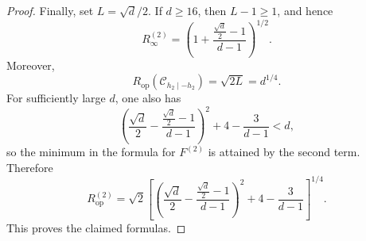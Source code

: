 \documentclass[10pt,a4paper]{amsart}
\begin{document}
\begin{proof}
Finally, set $L=\sqrt d/2$. If $d\ge16$, then $L-1\ge1$, and hence
\[
R_\infty^{(2)}
=
\left(
1+\frac{\frac{\sqrt d}{2}-1}{d-1}
\right)^{1/2}.
\]
Moreover,
\[
R_{\mathrm{op}}(\mathcal C_{h_2\mid-h_2})
=
\sqrt{2L}
=
d^{1/4}.
\]
For sufficiently large $d$, one also has
\[
\left(
\frac{\sqrt d}{2}
-
\frac{\frac{\sqrt d}{2}-1}{d-1}
\right)^2
+
4-\frac{3}{d-1}
< d,
\]
so the minimum in the formula for $F^{(2)}$ is attained by the second term. Therefore
\[
R_{\mathrm{op}}^{(2)}
=
\sqrt2
\left[
\left(
\frac{\sqrt d}{2}
-
\frac{\frac{\sqrt d}{2}-1}{d-1}
\right)^2
+
4-\frac{3}{d-1}
\right]^{1/4}.
\]
This proves the claimed formulas.
\end{proof}
\end{document}
